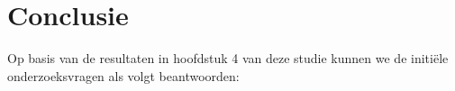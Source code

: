 
\chapter{Conclusie}%
\label{ch:conclusie}


Op basis van de resultaten in hoofdstuk 4 van deze studie kunnen we de initiële onderzoeksvragen als volgt beantwoorden:

